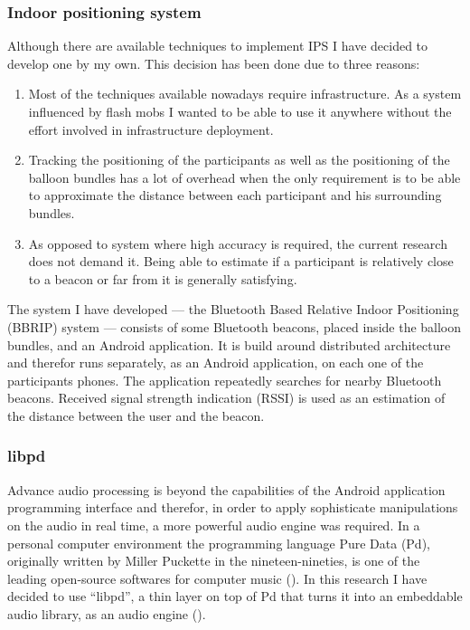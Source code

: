 \documentclass[a4paper,11pt]{article}
\begin{document}
\subsubsection{Indoor positioning system}\label{methods:ips}

Although there are available techniques to implement IPS I have decided to develop one by my own.
This decision has been done due to three reasons:
\begin{enumerate}
	\item Most of the techniques available nowadays require infrastructure.
	As a system influenced by flash mobs I wanted to be able to use it anywhere without the effort involved in infrastructure deployment.
	\item Tracking the positioning of the participants as well as the positioning of the balloon bundles has a lot of overhead when the only requirement is to be able to approximate the distance between each participant and his surrounding bundles.
	\item As opposed to system where high accuracy is required, the current research does not demand it.
	Being able to estimate if a participant is relatively close to a beacon or far from it is generally satisfying.
\end{enumerate}

The system I have developed --- the Bluetooth Based Relative Indoor Positioning (BBRIP) system --- consists of some Bluetooth beacons, placed inside the balloon bundles, and an Android application.
It is build around distributed architecture and therefor runs separately, as an Android application, on each one of the participants phones.
The application repeatedly searches for nearby Bluetooth beacons.
Received signal strength indication (RSSI) is used as an estimation of the distance between the user and the beacon.

\subsubsection{libpd}\label{methods:libpd}

Advance audio processing is beyond the capabilities of the Android application programming interface and therefor, in order to apply sophisticate manipulations on the audio in real time, a more powerful audio engine was required.
In a personal computer environment the programming language Pure Data (Pd), originally written by Miller Puckette in the nineteen-nineties, is one of the leading open-source softwares for computer music (\citeauthor{web:pd}).
In this research I have decided to use ``libpd'', a thin layer on top of Pd that turns it into an embeddable audio library, as an audio engine (\cite[p. v]{brinkmann12}).
\end{document}
